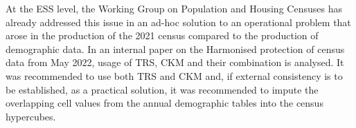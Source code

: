 At the ESS level, the Working Group on Population and Housing Censuses has already addressed this issue in an ad-hoc solution to an operational problem that arose in the production of the 2021 census compared to the production of demographic data. In an internal paper on the Harmonised protection of census data from May 2022, usage of TRS, CKM and their combination is analysed. It was recommended to use both TRS and CKM and, if external consistency is to be established, as a practical solution, it was recommended to impute the overlapping cell values from the annual demographic tables into the census hypercubes.


